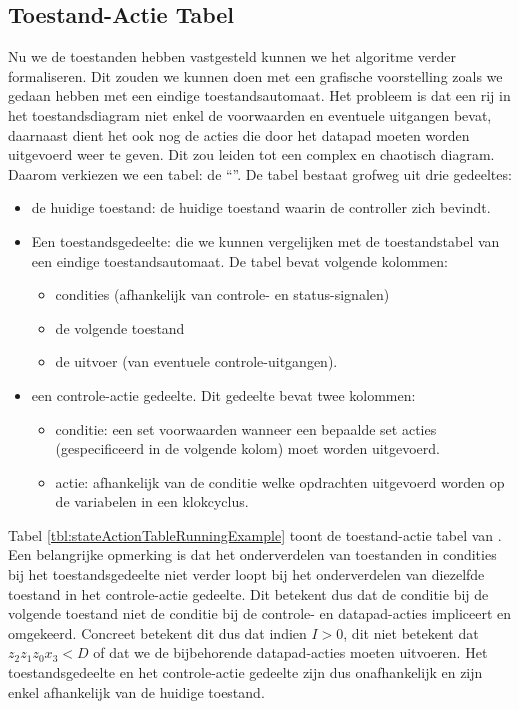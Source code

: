 \subsection{Toestand-Actie Tabel}
Nu we de toestanden hebben vastgesteld kunnen we het algoritme verder formaliseren. Dit zouden we kunnen doen met een grafische voorstelling zoals we gedaan hebben met een eindige toestandsautomaat. Het probleem is dat een rij in het toestandsdiagram niet enkel de voorwaarden en eventuele uitgangen bevat, daarnaast dient het ook nog de acties die door het datapad moeten worden uitgevoerd weer te geven. Dit zou leiden tot een complex en chaotisch diagram. Daarom verkiezen we een tabel: de ``''. De tabel bestaat grofweg uit drie gedeeltes:
\begin{itemize}
 \item de huidige toestand: de huidige toestand waarin de controller zich bevindt.
 \item Een toestandsgedeelte: die we kunnen vergelijken met de toestandstabel van een eindige toestandsautomaat. De tabel bevat volgende kolommen:
 \begin{itemize}
  \item condities (afhankelijk van controle- en status-signalen)
  \item de volgende toestand
  \item de uitvoer (van eventuele controle-uitgangen).
 \end{itemize}
 \item een controle-actie gedeelte. Dit gedeelte bevat twee kolommen:
 \begin{itemize}
  \item conditie: een set voorwaarden wanneer een bepaalde set acties (gespecificeerd in de volgende kolom) moet worden uitgevoerd.
  \item actie: afhankelijk van de conditie welke opdrachten uitgevoerd worden op de variabelen in een klokcyclus.
 \end{itemize}
\end{itemize}
Tabel \ref{tbl:stateActionTableRunningExample} toont de toestand-actie tabel van . Een belangrijke opmerking is dat het onderverdelen van toestanden in condities bij het toestandsgedeelte niet verder loopt bij het onderverdelen van diezelfde toestand in het controle-actie gedeelte. Dit betekent dus dat de conditie bij de volgende toestand niet de conditie bij de controle- en datapad-acties impliceert en omgekeerd. Concreet betekent dit dus dat indien $I>0$, dit niet betekent dat $z_2z_1z_0x_3<D$ of dat we de bijbehorende datapad-acties moeten uitvoeren. Het toestandsgedeelte en het controle-actie gedeelte zijn dus onafhankelijk en zijn enkel afhankelijk van de huidige toestand.
